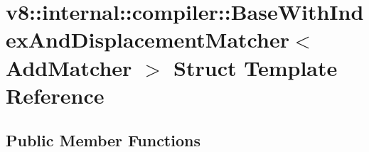 \hypertarget{structv8_1_1internal_1_1compiler_1_1BaseWithIndexAndDisplacementMatcher}{}\section{v8\+:\+:internal\+:\+:compiler\+:\+:Base\+With\+Index\+And\+Displacement\+Matcher$<$ Add\+Matcher $>$ Struct Template Reference}
\label{structv8_1_1internal_1_1compiler_1_1BaseWithIndexAndDisplacementMatcher}
\subsection*{Public Member Functions}
